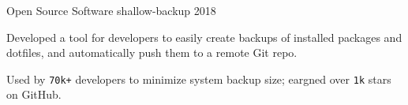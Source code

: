 \begin{cventries}


\cventry
{Open Source Software} %
{shallow-backup} %
{} %
{2018} %
{
	\begin{cvitems} %
		\item {Developed a tool for developers to easily create backups of installed packages and dotfiles, and automatically push them to a remote Git repo.}
		\item {Used by \texttt{70k+} developers to minimize system backup size; eargned over \texttt{1k} stars on GitHub.}
	\end{cvitems}
}

\end{cventries}
